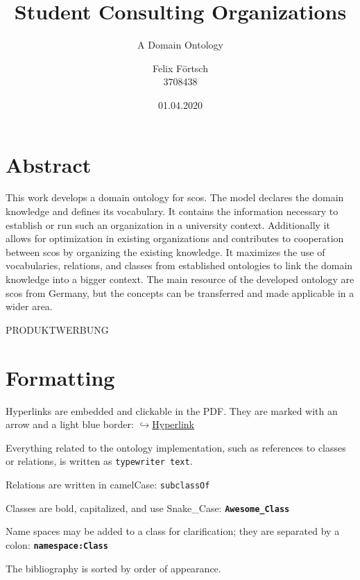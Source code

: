 \documentclass[a4paper, DIV=13, BCOR=0cm]{scrbook}
\newcommand{\class}[1]{\texttt{\textbf{#1}}}
\newcommand{\link}[2]{\href{#1}{$\hookrightarrow$#2}}
\begin{document}
\titlehead{
	Document Version: v16 \\
	Overall Progress: 
}
\subject{Bachelor's Thesis}
\title{Student Consulting Organizations}
\subtitle{A Domain Ontology}
\author{Felix Förtsch \\ 3708438}
\date{01.04.2020}
\publishers{Leipzig University}
\maketitle

\frontmatter
\chapter*{Abstract }
	This work develops a domain ontology for \glspl{sco}. The model declares the domain knowledge and defines its vocabulary. It contains the information necessary to establish or run such an organization in a university context. Additionally it allows for optimization in existing organizations and contributes to cooperation between \glspl{sco} by organizing the existing knowledge. It maximizes the use of vocabularies, relations, and classes from established ontologies to link the domain knowledge into a bigger context. The main resource of the developed ontology are \glspl{sco} from Germany, but the concepts can be transferred and made applicable in a wider area.
	
	PRODUKTWERBUNG

\chapter*{Formatting}
\begin{compactitem}
	\item Hyperlinks are embedded and clickable in the PDF. They are marked with an arrow and a light blue border: \link{https://hyperlink.com}{Hyperlink}
	\item Everything related to the ontology implementation, such as references to classes or relations, is written as \texttt{typewriter text}.
	\item Relations are written in camelCase: \texttt{subclassOf}
	\item Classes are bold, capitalized, and use Snake\_Case: \texttt{\textbf{Awesome\_Class}}
	\item Name spaces may be added to a class for clarification; they are separated by a colon: \class{namespace:Class}
	\item The bibliography is sorted by order of appearance.
\end{compactitem}
\end{document}
